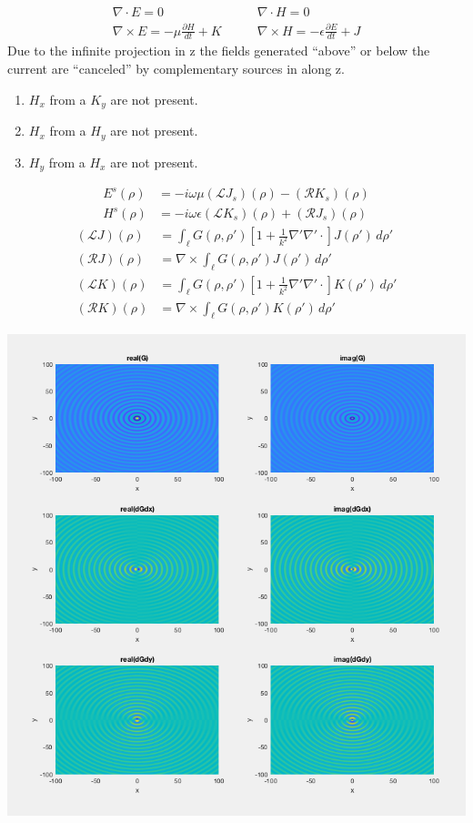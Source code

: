 \documentclass{article}
\newcommand{\0}{\varnothing}
\begin{document}
\begin{minipage}{0.45\textwidth}
\begin{align*}
\nabla \cdot E = 0 \quad \quad
& \nabla \cdot H = 0 \\
\nabla \times E = -\mu \frac{\partial H}{dt} + K\quad \quad 
& \nabla \times H = -\epsilon \frac{\partial E}{dt} + J
\end{align*}
Due to the infinite projection in z the fields generated ``above'' or below the current are ``canceled'' by complementary sources in along z. 
    \begin{enumerate}
        \item $H_x$ from a $K_y$ are not present.
        \item $H_x$ from a $H_y$ are not present.
        \item $H_y$ from a $H_x$ are not present.
    \end{enumerate}
\begin{align*}
    E^s(\rho) &= -i\omega\mu(\mathcal{L}J_s)(\rho) - (\mathcal{R}K_s)(\rho)\\
    H^s(\rho) &= -i\omega\epsilon(\mathcal{L}K_s)(\rho) + (\mathcal{R}J_s)(\rho)
\end{align*}
\begin{align*}
    (\mathcal{L}J)(\rho) &= \int_{\ell}G(\rho,\rho')[1+\frac{1}{k^2}\nabla'\nabla'\cdotp]J(\rho') \,d\rho'\\
    (\mathcal{R}J)(\rho) &= \nabla \times \int_{\ell}G(\rho,\rho')J(\rho') \,d\rho'\\
    (\mathcal{L}K)(\rho) &= \int_{\ell}G(\rho,\rho')[1+\frac{1}{k^2}\nabla'\nabla'\cdotp]K(\rho') \,d\rho'\\
    (\mathcal{R}K)(\rho) &= \nabla \times \int_{\ell}G(\rho,\rho')K(\rho') \,d\rho'
\end{align*}
\end{minipage}
\begin{minipage}{0.55\textwidth}
\begin{center}
\includegraphics[width=0.75\columnwidth]{figures/GFct}
\end{center}
\end{minipage}
\end{document}
